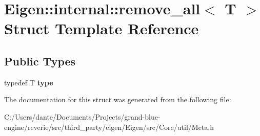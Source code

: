 \hypertarget{struct_eigen_1_1internal_1_1remove__all}{}\section{Eigen\+::internal\+::remove\+\_\+all$<$ T $>$ Struct Template Reference}
\label{struct_eigen_1_1internal_1_1remove__all}
\subsection*{Public Types}
\begin{DoxyCompactItemize}
\item 
\mbox{\label{struct_eigen_1_1internal_1_1remove__all_a5779acf852f62735a7d293d29b18e321}} 
typedef T {\bfseries type}
\end{DoxyCompactItemize}


The documentation for this struct was generated from the following file\+:\begin{DoxyCompactItemize}
\item 
C\+:/\+Users/dante/\+Documents/\+Projects/grand-\/blue-\/engine/reverie/src/third\+\_\+party/eigen/\+Eigen/src/\+Core/util/Meta.\+h\end{DoxyCompactItemize}
